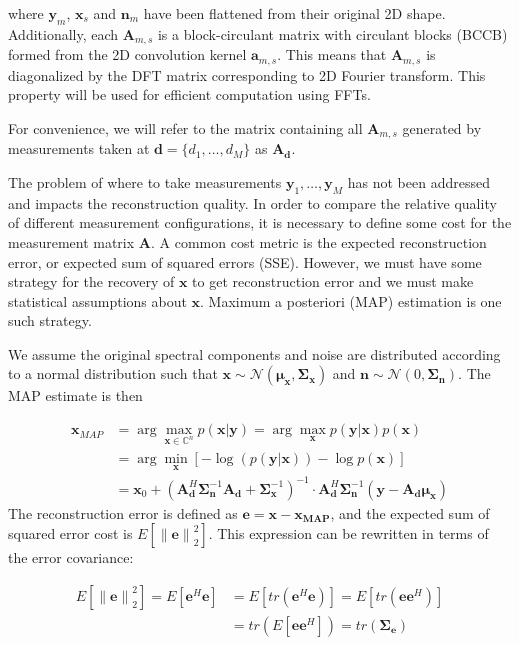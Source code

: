\documentclass{article}
\providecommand{\norm}[1]{\left\lVert#1\right\rVert}
\begin{document}
where $\bm{y}_m$, $\bm{x}_s$ and $\bm{n}_m$ have been flattened from their
original 2D shape.  Additionally, each $\bm{A}_{m,s}$ is a block-circulant
matrix with circulant blocks (BCCB) formed from the 2D convolution kernel $\bm{a}_{m,s}$.
This means that $\bm{A}_{m,s}$ is diagonalized by the DFT matrix corresponding
to 2D Fourier transform. This property will be used for efficient computation
using FFTs.

For convenience, we will refer to the matrix containing all $\bm{A}_{m,s}$
generated by measurements taken at $\bm{d} = \{d_1, \dots, d_M\}$ as
$\bm{A}_{\bm{d}}$.

The problem of where to take measurements $\bm{y}_1, \dots, \bm{y}_M$ has not
been addressed and impacts the reconstruction quality.  In order to
compare the relative quality of different measurement configurations, it is
necessary to define some cost for the measurement matrix $\bm{A}$.  A common cost
metric is the expected reconstruction error, or expected sum of squared errors
(SSE). However, we must have some strategy for the recovery of $\bm{x}$ to get
reconstruction error and we must make statistical assumptions about $\bm{x}$.
Maximum a posteriori (MAP) estimation is one such strategy.

We assume the original spectral components and noise are distributed according to a
normal distribution such that $\bm{x} \sim \mathcal{N}(\bm{\mu}_{\bm{x}}, \bm{\Sigma}_{\bm{x}})$ and
$\bm{n} \sim \mathcal{N}(0, \bm{\Sigma}_{\bm{n}})$.  The MAP estimate is then

$$
\begin{aligned}
  \bm{x}_{MAP} &= \arg \max_{\bm{x} \in \mathbb{C}^n} p(\bm{x} | \bm{y})
  = \arg \max_{\bm{x}} p(\bm{y}|\bm{x}) p(\bm{x})\\
  &= \arg \min_{\bm{x}} \left[  - \log(p(\bm{y}|\bm{x})) - \log
  p(\bm{x})\right] \\
  &= \bm{x}_0 + \left( \bm{A}_{\bm{d}}^H\bm{\Sigma}_{\bm{n}}^{-1} \bm{A}_{\bm{d}} +
    \bm{\Sigma}_{\bm{x}}^{-1}\right)^{-1}
  \cdot  \bm{A}_{\bm{d}}^H \bm{\Sigma}_{\bm{n}}^{-1} (\bm{y} - \bm{A}_{\bm{d}} \bm{\mu}_{\bm{x}})
\end{aligned}
$$
The reconstruction error is defined as $\bm{e} = \bm{x} - \bm{x_{\text{MAP}}}$,
and the expected sum of squared error cost is $E[\norm{\bm{e}}_2^2]$. This
expression can be rewritten in terms of the error covariance:

\begin{align*}
E[\norm{\bm{e}}_2^2] =  E[\bm{e}^H\bm{e}] & = E[tr(\bm{e}^H\bm{e})] = E[tr(\bm{e}\bm{e}^H)] \\
& = tr(E[\bm{e}\bm{e}^H]) = tr(\bm{\Sigma}_{\bm{e}})
\end{align*}
\end{document}
